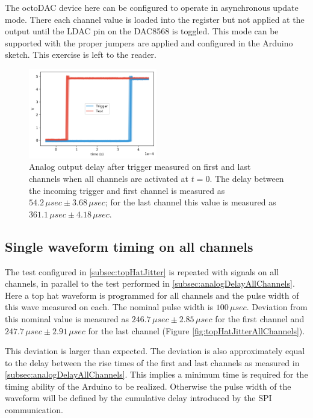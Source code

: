 \documentclass[10pt,a4paper]{article}
\begin{document}
The octoDAC device here can be configured to operate in asynchronous update mode. There each channel value is loaded into the register but not applied at the output until the LDAC pin on the DAC8568 is toggled.  This mode can be supported with the proper jumpers are applied and configured in the Arduino sketch.  This exercise is left to the reader.

\begin{figure}
	\centering
	\includegraphics[width=0.5\textwidth]{../output/analogJitterAllChannels.png}
	\caption[analogJitterAllChannels]{Analog output delay after trigger measured on first and last channels when all channels are activated at $t = 0$.  The delay between the incoming trigger and first channel is measured as $54.2\,\mu sec \pm 3.68\,\mu sec$; for the last channel this value is measured as $361.1\,\mu sec \pm 4.18\, \mu sec$.\newline}
	\label{fig:analogDelayAllChannels}
\end{figure} 

\subsection{Single waveform timing on all channels}
\label{subsec:topHatAllChannels}

The test configured in \ref{subsec:topHatJitter} is repeated with signals on all channels, in parallel to the test performed in \ref{subsec:analogDelayAllChannels}.  Here a top hat waveform is programmed for all channels and the pulse width of this wave measured on each. The nominal pulse width is $100\,\mu sec$.  Deviation from this nominal value is measured as $246.7\,\mu sec \pm 2.85\,\mu sec$ for the first channel and $247.7\,\mu sec \pm 2.91\,\mu sec$ for the last channel (Figure \ref{fig:topHatJitterAllChannels}). 

This deviation is larger than expected.  The deviation is also approximately equal to the delay between the rise times of the first and last channels as measured in \ref{subsec:analogDelayAllChannels}.  This implies a minimum time is required for the timing ability of the Arduino to be realized.  Otherwise the pulse width of the waveform will be defined by the cumulative delay introduced by the SPI communication.  
\end{document}
